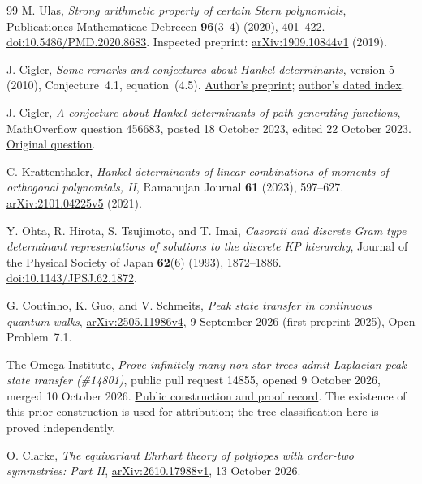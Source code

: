 \documentclass[11pt,a4paper]{article}
\theoremstyle{definition}\newtheorem{definition}[theorem]{Definition}
\theoremstyle{remark}\newtheorem{remark}[theorem]{Remark}
\begin{document}
\begin{thebibliography}{99}
M. Ulas, \emph{Strong arithmetic property of certain Stern polynomials},
Publicationes Mathematicae Debrecen \textbf{96}(3--4) (2020), 401--422.
\href{https://doi.org/10.5486/PMD.2020.8683}{doi:10.5486/PMD.2020.8683}.
Inspected preprint: \href{https://arxiv.org/abs/1909.10844v1}{arXiv:1909.10844v1} (2019).

J. Cigler, \emph{Some remarks and conjectures about Hankel determinants},
version 5 (2010), Conjecture~4.1, equation~(4.5).
\href{https://homepage.univie.ac.at/johann.cigler/preprints/conjectures-hankel.pdf}{Author's preprint};
\href{https://homepage.univie.ac.at/johann.cigler/prepr.html}{author's dated index}.

J. Cigler, \emph{A conjecture about Hankel determinants of path generating functions},
MathOverflow question 456683, posted 18 October 2023, edited 22 October 2023.
\href{https://mathoverflow.net/questions/456683}{Original question}.

C. Krattenthaler, \emph{Hankel determinants of linear combinations of
moments of orthogonal polynomials, II}, Ramanujan Journal \textbf{61}
(2023), 597--627.
\href{https://arxiv.org/abs/2101.04225v5}{arXiv:2101.04225v5} (2021).

Y. Ohta, R. Hirota, S. Tsujimoto, and T. Imai,
\emph{Casorati and discrete Gram type determinant representations of
solutions to the discrete KP hierarchy}, Journal of the Physical Society
of Japan \textbf{62}(6) (1993), 1872--1886.
\href{https://doi.org/10.1143/JPSJ.62.1872}{doi:10.1143/JPSJ.62.1872}.

G. Coutinho, K. Guo, and V. Schmeits,
\emph{Peak state transfer in continuous quantum walks},
\href{https://arxiv.org/abs/2505.11986v4}{arXiv:2505.11986v4},
9 September 2026 (first preprint 2025), Open Problem~7.1.

The Omega Institute, \emph{Prove infinitely many non-star trees admit
Laplacian peak state transfer (\#14801)}, public pull request 14855,
opened 9 October 2026, merged 10 October 2026.
\href{https://github.com/the-omega-institute/trureturing/pull/14855}{Public construction and proof record}.
The existence of this prior construction is used for attribution;
the tree classification here is proved independently.

O. Clarke, \emph{The equivariant Ehrhart theory of polytopes with
order-two symmetries: Part II},
\href{https://arxiv.org/abs/2610.17988v1}{arXiv:2610.17988v1},
13 October 2026.


\end{thebibliography}
\end{document}
